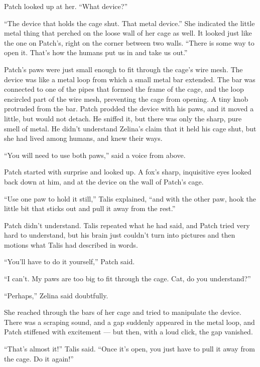 \documentclass[ebook,oneside,openany,17pt]{memoir}
\newenvironment{tolerant}[1]{%
  \par\tolerance=#1\relax
}{%
  \par
}
\begin{document}
Patch looked up at her. “What device?”

\begin{tolerant}{1000}
“The device that holds the cage shut. That metal device.” She
indicated the little metal thing that perched on the loose wall of her
cage as well. It looked just like the one on Patch’s, right on the
corner between two walls. “There is some way to open it. That’s how
the humans put us in and take us out.”
\end{tolerant}

\begin{tolerant}{1500}
Patch’s paws were just small enough to fit through the cage’s wire
mesh. The device was like a metal loop from which a small metal bar
extended. The bar was connected to one of the pipes that formed the
frame of the cage, and the loop encircled part of the wire mesh,
preventing the cage from opening. A tiny knob protruded from the
bar. Patch prodded the device with his paws, and it moved a little,
but would not detach. He sniffed it, but there was only the sharp,
pure smell of metal. He didn’t understand Zelina’s claim that it held
his cage shut, but she had lived among humans, and knew their ways.
\end{tolerant}

“You will need to use both paws,” said a voice from above.

Patch started with surprise and looked up. A fox’s sharp, inquisitive
eyes looked back down at him, and at the device on the wall of Patch’s
cage.

“Use one paw to hold it still,” Talis explained, “and with the other
paw, hook the little bit that sticks out and pull it away from the
rest.”

Patch didn’t understand. Talis repeated what he had said, and Patch
tried very hard to understand, but his brain just couldn’t turn into
pictures and then motions what Talis had described in words.

“You’ll have to do it yourself,” Patch said.

“I can’t. My paws are too big to fit through the cage. Cat, do you
understand?”

“Perhaps,” Zelina said doubtfully.

She reached through the bars of her cage and tried to manipulate the
device. There was a scraping sound, and a gap suddenly appeared in the
metal loop, and Patch stiffened with excitement — but then, with a
loud click, the gap vanished.

“That’s almost it!” Talis said. “Once it’s open, you just have to pull
it away from the cage. Do it again!”
\end{document}
